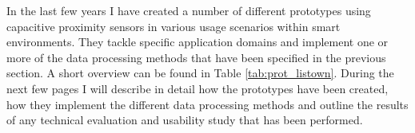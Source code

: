 In the last few years I have created a number of different prototypes using capacitive proximity sensors in various usage scenarios within smart environments. They tackle specific application domains and implement one or more of the data processing methods that have been specified in the previous section. A short overview can be found in Table \ref{tab:prot_listown}. During the next few pages I will describe in detail how the prototypes have been created, how they implement the different data processing methods and outline the results of any technical evaluation and usability study that has been performed.

\clearpage

\clearpage

\clearpage

\clearpage

\clearpage

\clearpage

\clearpage

